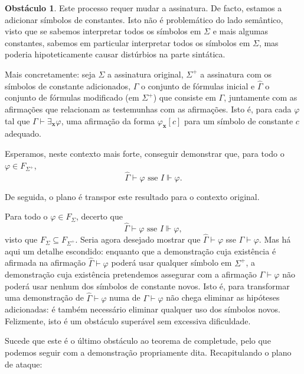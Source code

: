 \documentclass{report}
\theoremstyle{definition}
\newtheorem{obstaculo}{Obstáculo}
\theoremstyle{remark}
\renewcommand{\bf}[1]{\mathbf{#1}}
\begin{document}
	\begin{obstaculo}
	Este processo requer mudar a assinatura. De facto, estamos a adicionar símbolos de constantes. Isto não é problemático do lado semântico, visto que se sabemos interpretar todos os símbolos em $\Sigma$ e mais algumas constantes, sabemos em particular interpretar todos os símbolos em $\Sigma$, mas poderia hipoteticamente causar distúrbios na parte sintática.
	
	Mais concretamente: seja $\Sigma$ a assinatura original, $\Sigma^+$ a assinatura com os símbolos de constante adicionados, $\Gamma$ o conjunto de fórmulas inicial e $\widehat\Gamma$ o conjunto de fórmulas modificado (em $\Sigma^+$) que consiste em $\Gamma$, juntamente com as afirmações que relacionam as testemunhas com as afirmações. Isto é, para cada $\varphi$ tal que $\Gamma \vdash \exists_{\bf x} \varphi$, uma afirmação da forma $\varphi_{\bf x}[c]$ para um símbolo de constante $c$ adequado.
	
	Esperamos, neste contexto mais forte, conseguir demonstrar que, para todo o $\varphi \in F_{\Sigma^+}$,
	\[\widehat\Gamma \vdash \varphi \text{ sse } I \Vdash \varphi.\]
	
	De seguida, o plano é transpor este resultado para o contexto original.
	
	Para todo o $\varphi \in F_{\Sigma}$, decerto que
	\[\widehat\Gamma \vdash \varphi \text{ sse } I \Vdash \varphi,\]
	visto que $F_{\Sigma} \subseteq F_{\Sigma^+}$. Seria agora desejado mostrar que $\widehat\Gamma \vdash \varphi$ sse $\Gamma \vdash \varphi$. Mas há aqui um detalhe escondido: enquanto que a demonstração cuja existência é afirmada na afirmação $\widehat\Gamma \vdash \varphi$ poderá usar qualquer símbolo em $\Sigma^+$, a demonstração cuja existência pretendemos assegurar com a afirmação $\Gamma \vdash \varphi$ não poderá usar nenhum dos símbolos de constante novos. Isto é, para transformar uma demonstração de $\widehat\Gamma \vdash \varphi$ numa de $\Gamma \vdash \varphi$ não chega eliminar as hipóteses adicionadas: é também necessário eliminar qualquer uso dos símbolos novos. Felizmente, isto é um obstáculo superável sem excessiva dificuldade.
	\end{obstaculo}
	
	Sucede que este é o último obstáculo ao teorema de completude, pelo que podemos seguir com a demonstração propriamente dita. Recapitulando o plano de ataque:
	
\end{document}
